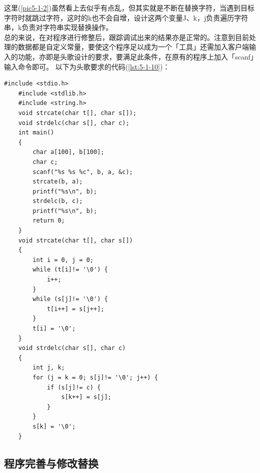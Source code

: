 \documentclass[supercite]{Experimental_Report}
\theoremstyle{definition}
\begin{document}
	这里(\ref{pic5-1-2})虽然看上去似乎有点乱，但其实就是不断在替换字符，当遇到目标字符时就跳过字符，这时的k也不会自增，设计这两个变量J、k，j负责遍历字符串，k负责对字符串实现替换操作。
	\\
	总的来说，在对程序进行修整后，跟踪调试出来的结果亦是正常的。注意到目前处理的数据都是自定义常量，要使这个程序足以成为一个「工具」还需加入客户端输入的功能，亦即是头歌设计的要求，要满足此条件，在原有的程序上加入「scanf」输入命令即可。
	以下为头歌要求的代码(\ref{lst:5-1-10})：\\
	\begin{lstlisting}[style=commonCodeStyle, caption={示例}, label={lst:5-1-10}]
	#include <stdio.h>
	#include <stdlib.h>
	#include <string.h>
	void strcate(char t[], char s[]);
	void strdelc(char s[], char c);
	int main()
	{
		char a[100], b[100];
		char c;
		scanf("%s %s %c", b, a, &c);
		strcate(b, a);
		printf("%s\n", b);
		strdelc(b, c);
		printf("%s\n", b);
		return 0;
	}
	void strcate(char t[], char s[])
	{
		int i = 0, j = 0;
		while (t[i]!= '\0') {
			i++;
		}
		while (s[j]!= '\0') {
			t[i++] = s[j++];
		}
		t[i] = '\0';
	}
	void strdelc(char s[], char c)
	{
		int j, k;
		for (j = k = 0; s[j]!= '\0'; j++) {
			if (s[j]!= c) {
				s[k++] = s[j];
			}
		}
		s[k] = '\0';
	}
	\end{lstlisting}

\newpage

		\subsection{程序完善与修改替换}
\end{document}
